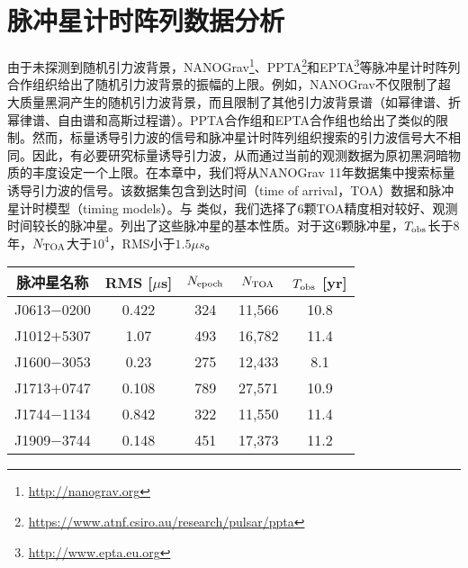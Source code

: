 \section{脉冲星计时阵列数据分析}
由于未探测到随机引力波背景，NANOGrav\footnote{\url{http://nanograv.org}}、PPTA\footnote{\url{https://www.atnf.csiro.au/research/pulsar/ppta}}和EPTA\footnote{\url{http://www.epta.eu.org}}等脉冲星计时阵列合作组织给出了随机引力波背景的振幅的上限。例如，NANOGrav不仅限制了超大质量黑洞产生的随机引力波背景，而且限制了其他引力波背景谱（如幂律谱、折幂律谱、自由谱和高斯过程谱\cite{Arzoumanian:2018saf}）。PPTA合作组\cite{Shannon:2013wma}和EPTA合作组\cite{vanHaasteren:2011ni}也给出了类似的限制。然而，标量诱导引力波的信号和脉冲星计时阵列组织搜索的引力波信号大不相同。因此，有必要研究标量诱导引力波，从而通过当前的观测数据为原初黑洞暗物质的丰度设定一个上限。在本章中，我们将从NANOGrav 11年数据集中搜索标量诱导引力波的信号。该数据集包含到达时间（time of arrival，TOA）数据和脉冲星计时模型（timing models）\cite{Arzoumanian:2017puf}。与 \cite{Kato:2019bqz}类似，我们选择了6颗TOA精度相对较好、观测时间较长的脉冲星。列出了这些脉冲星的基本性质。对于这6颗脉冲星，$T_{\rm{obs}}$长于$8$年，$N_{\rm{TOA}}$大于$10^4$，RMS小于$1.5\mu s$。
\begin{table}[htb]
    \begin{center}
    \begin{tabular}{ccccc}
        \hline\hline
        脉冲星名称\hspace{1mm} & RMS [$\mu$s]\hspace{1mm} & $N_{\rm{epoch}}$\hspace{1mm} & $N_{\rm{TOA}}$\hspace{1mm} & $T_{\rm{obs}}$ [yr] \\
        \hline    
        J0613$-$0200 & 0.422 & 324 & 11,566 & 10.8  \\
        J1012$+$5307 & 1.07 & 493 & 16,782 & 11.4  \\
        J1600$-$3053 & 0.23 & 275 & 12,433 & 8.1  \\
        J1713$+$0747 & 0.108 & 789 & 27,571 & 10.9  \\
        J1744$-$1134 & 0.842 & 322 & 11,550 & 11.4  \\
        J1909$-$3744 & 0.148 & 451 & 17,373 & 11.2  \\    
        \hline \hline
    \end{tabular}
\label{pulsars}
    \end{center}
\end{table}


